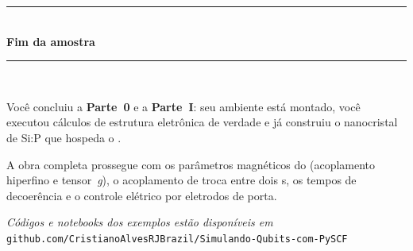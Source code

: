 \cleardoublepage
\thispagestyle{empty}
\begin{center}
  \vspace*{3cm}
  {\color{azulpyscf}\rule{0.8\textwidth}{1.5pt}}\\[0.8cm]
  {\LARGE\sffamily\bfseries\color{azulpyscf} Fim da amostra}\\[0.8cm]
  {\color{azulpyscf}\rule{0.8\textwidth}{1.5pt}}\\[1.2cm]

  \begin{minipage}{0.8\textwidth}
  \large
  Você concluiu a \textbf{Parte~0} e a \textbf{Parte~I}: seu ambiente está
  montado, você executou cálculos de estrutura eletrônica de verdade e já
  construiu o nanocristal de Si:P que hospeda o \qubit{}.

  \vspace{0.5cm}
  A obra completa prossegue com os parâmetros magnéticos do \qubit{}
  (acoplamento hiperfino e tensor~\emph{g}), o acoplamento de troca entre
  dois \qubit{}s, os tempos de decoerência e o controle elétrico por
  eletrodos de porta.

  \vspace{0.5cm}
  \centering
  \textit{Códigos e \emph{notebooks} dos exemplos estão disponíveis em}\\
  \texttt{github.com/CristianoAlvesRJBrazil/Simulando-Qubits-com-PySCF}
  \end{minipage}
\end{center}


